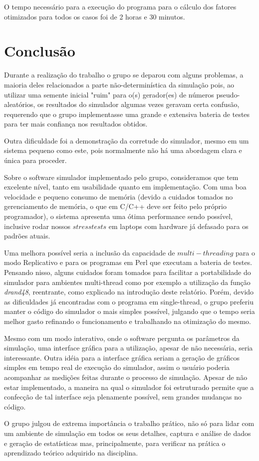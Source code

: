 \documentclass[a4paper,10pt]{article}
\begin{document}
O tempo necessário para a execução do programa para o cálculo dos fatores otimizados para todos os casos foi de 2 horas e 30 minutos.

\pagebreak

\section{Conclusão}

    Durante a realização do trabalho o grupo se deparou com alguns problemas, a maioria deles relacionados a parte não-determinística da simulação pois, ao utilizar uma semente inicial "ruim" para o(s) gerador(es) de números pseudo-aleatórios, os resultados do simulador algumas vezes geravam certa confusão, requerendo que o grupo implementasse uma grande e extensiva bateria de testes para ter mais confiança nos resultados obtidos.

Outra dificuldade foi a demonstração da corretude do simulador, mesmo em um sistema pequeno como este, pois normalmente não há uma abordagem clara e única para proceder.

    Sobre o software simulador implementado pelo grupo, consideramos que tem excelente nível, tanto em usabilidade quanto em implementação. Com uma boa velocidade e pequeno consumo de memória (devido a cuidados tomados no gerenciamento de memória, o que em C/C++ deve ser feito pelo próprio programador), o sistema apresenta uma ótima performance sendo possível, inclusive rodar nossos $stress tests$ em laptops com hardware já defasado para os padrões atuais.


    Uma melhora possível seria a inclusão da capacidade de $multi-threading$ para o modo Replicativo e para os programas em Perl que executam a bateria de testes. Pensando nisso, alguns cuidados foram tomados para facilitar a portabilidade do simulador para ambientes multi-thread como por exemplo a utilização da função \emph{drand48}, reentrante, como explicado na introdução deste relatório. Porém, devido as dificuldades já encontradas com o programa em single-thread, o grupo preferiu manter o código do simulador o mais simples possível, julgando que o tempo seria melhor gasto refinando o funcionamento e trabalhando na otimização do mesmo.

    Mesmo com um modo interativo, onde o software pergunta os parâmetros da simulação, uma interface gráfica para a utilização, apesar de não necessária, seria interessante. Outra idéia para a interface gráfica seriam a geração de gráficos simples em tempo real de execução do simulador, assim o usuário poderia acompanhar as medições feitas durante o processo de simulação. Apesar de não estar implementado, a maneira na qual o simulador foi estruturado permite que a confecção de tal interface seja plenamente possível, sem grandes mudanças no código.

    O grupo julgou de extrema importância o trabalho prático, não só para lidar com um ambiente de simulação em todos os seus detalhes, captura e análise de dados e geração de estatísticas mas, principalmente, para verificar na prática o aprendizado teórico adquirido na disciplina.
\pagebreak
\end{document}

